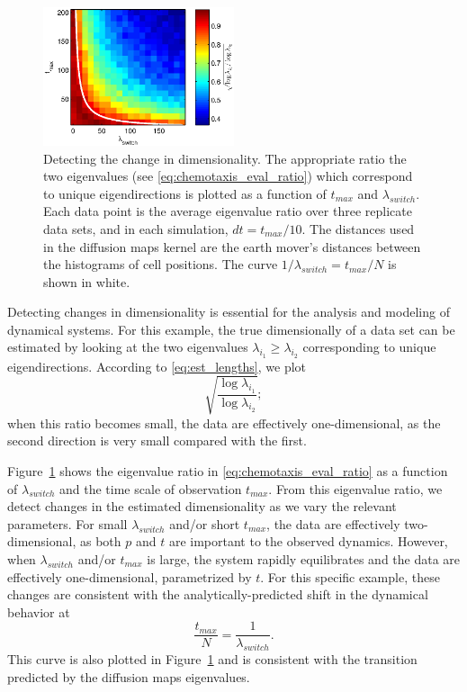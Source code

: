 \begin{figure}[t]
%
\centering
\includegraphics[width=0.5\textwidth]{tmax_lambda_transition}
%
\caption{Detecting the change in dimensionality. The appropriate ratio the two eigenvalues (see \eqref{eq:chemotaxis_eval_ratio}) which correspond to unique eigendirections is plotted as a function of $t_{max}$ and $\lambda_{switch}$. Each data point is the average eigenvalue ratio over three replicate data sets, and in each simulation, $dt=t_{max}/10$. The distances used in the diffusion maps kernel are the earth mover's distances between the histograms of cell positions. The curve $1/\lambda_{switch} = t_{max}/N$ is shown in white. }
%
\label{fig:chemotaxis_compare_timescales_evals}
%
\end{figure}

Detecting changes in dimensionality is essential for the analysis and modeling of dynamical systems.
%
For this example, the true dimensionally of a data set can be estimated by looking at the two eigenvalues $\lambda_{i_1} \ge \lambda_{i_2}$ corresponding to unique eigendirections.
%
According to \eqref{eq:est_lengths}, we plot
\begin{equation}\label{eq:chemotaxis_eval_ratio}
 \sqrt{\frac{\log \lambda_{i_1}}{\log \lambda_{i_2}}} ;
\end{equation}
when this ratio becomes small, the data are effectively one-dimensional, as the second direction is very small compared with the first.

Figure~\ref{fig:chemotaxis_compare_timescales_evals} shows the eigenvalue ratio in \eqref{eq:chemotaxis_eval_ratio} as a function of $\lambda_{switch}$ and the time scale of observation $t_{max}$.
%
From this eigenvalue ratio, we detect changes in the estimated dimensionality as we vary the relevant parameters.
%
For small $\lambda_{switch}$ and/or short $t_{max}$, the data are effectively two-dimensional, as both $p$ and $t$ are important to the observed dynamics.
%
However, when $\lambda_{switch}$ and/or $t_{max}$ is large, the system rapidly equilibrates and the data are effectively one-dimensional, parametrized by $t$.
%
For this specific example, these changes are consistent with the analytically-predicted shift in the dynamical behavior at
\begin{equation}
\frac{t_{max}}{N} = \frac{1}{\lambda_{switch}}.
\end{equation}
%
This curve is also plotted in Figure~\ref{fig:chemotaxis_compare_timescales_evals} and is consistent with the transition predicted by the diffusion maps eigenvalues.


